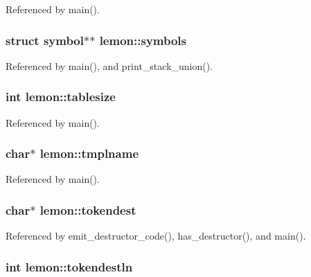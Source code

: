 Referenced by main().

\hypertarget{structlemon_a48601b9fa6772db8f0450213ee09d511}{
\subsubsection[{symbols}]{\setlength{\rightskip}{0pt plus 5cm}struct {\bf symbol}$\ast$$\ast$ lemon\-::symbols}}\label{structlemon_a48601b9fa6772db8f0450213ee09d511}


Referenced by main(), and print\-\_\-stack\-\_\-union().

\hypertarget{structlemon_ad52146abb13487cb1a6fa9ea9e53debd}{
\subsubsection[{tablesize}]{\setlength{\rightskip}{0pt plus 5cm}int lemon\-::tablesize}}\label{structlemon_ad52146abb13487cb1a6fa9ea9e53debd}


Referenced by main().

\hypertarget{structlemon_acd2bfd77e462d13f75fb6d85bce8ee8d}{
\subsubsection[{tmplname}]{\setlength{\rightskip}{0pt plus 5cm}char$\ast$ lemon\-::tmplname}}\label{structlemon_acd2bfd77e462d13f75fb6d85bce8ee8d}


Referenced by main().

\hypertarget{structlemon_a13e8e51c24bb346fd0d4130037e47674}{
\subsubsection[{tokendest}]{\setlength{\rightskip}{0pt plus 5cm}char$\ast$ lemon\-::tokendest}}\label{structlemon_a13e8e51c24bb346fd0d4130037e47674}


Referenced by emit\-\_\-destructor\-\_\-code(), has\-\_\-destructor(), and main().

\hypertarget{structlemon_a2cd0d2dca6fa9656edde10e519bee495}{
\subsubsection[{tokendestln}]{\setlength{\rightskip}{0pt plus 5cm}int lemon\-::tokendestln}}\label{structlemon_a2cd0d2dca6fa9656edde10e519bee495}


